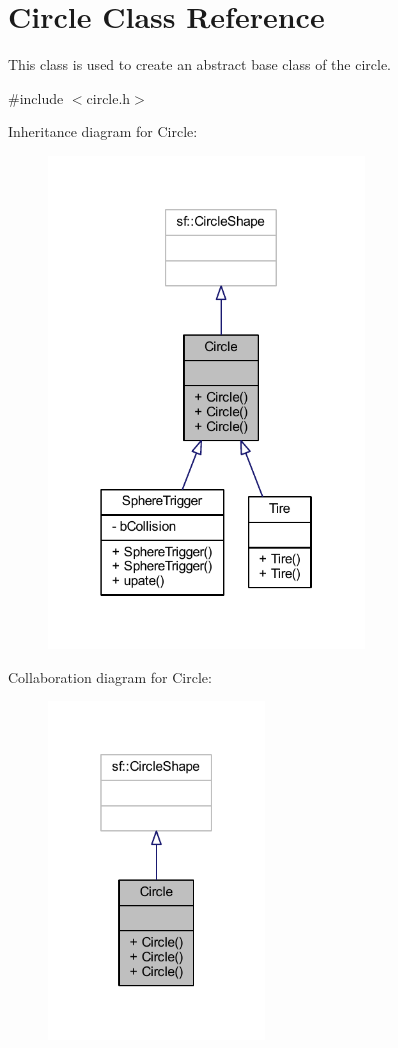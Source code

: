 \hypertarget{class_circle}{}\section{Circle Class Reference}
\label{class_circle}


This class is used to create an abstract base class of the circle.  




{\ttfamily \#include $<$circle.\+h$>$}



Inheritance diagram for Circle\+:\nopagebreak
\begin{figure}[H]
\begin{center}
\leavevmode
\includegraphics[width=238pt]{class_circle__inherit__graph}
\end{center}
\end{figure}


Collaboration diagram for Circle\+:\nopagebreak
\begin{figure}[H]
\begin{center}
\leavevmode
\includegraphics[width=163pt]{class_circle__coll__graph}
\end{center}
\end{figure}
